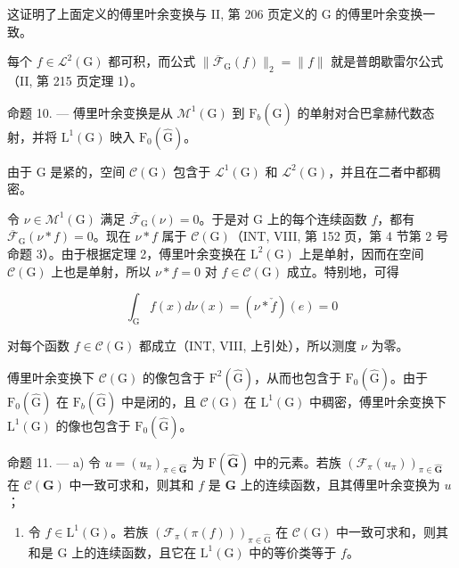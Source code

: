 这证明了上面定义的傅里叶余变换与 II, 第 206 页定义的 G 的傅里叶余变换一致。

每个 \(f \in \mathcal{L}^2(\mathrm{G})\) 都可积，而公式 \(\| \overline{\mathcal{F}}_{\mathrm{G}}(f)\| _2 = \| f\|\) 就是普朗歇雷尔公式（II, 第 215 页定理 1）。

命题 10. --- 傅里叶余变换是从 \(\mathcal{M}^{1}(\mathrm{G})\) 到 \(\mathrm{F}_{b}(\widehat{\mathrm{G}})\) 的单射对合巴拿赫代数态射，并将 \(\mathrm{L}^{1}(\mathrm{G})\) 映入 \(\mathrm{F}_{0}(\widehat{\mathrm{G}})\)。

由于 G 是紧的，空间 \(\mathcal{C}(\mathrm{G})\) 包含于 \(\mathcal{L}^{1}(\mathrm{G})\) 和 \(\mathcal{L}^{2}(\mathrm{G})\)，并且在二者中都稠密。

令 \(\nu \in \mathcal{M}^1 (\mathrm{G})\) 满足 \(\overline{\mathcal{F}}_{\mathrm{G}}(\nu) = 0\)。于是对 G 上的每个连续函数 \(f\)，都有 \(\overline{\mathcal{F}}_{\mathrm{G}}(\nu *f) = 0\)。现在 \(\nu *f\) 属于 \(\mathcal{C}(\mathrm{G})\)（INT, VIII, 第 152 页，第 4 节第 2 号命题 3）。由于根据定理 2，傅里叶余变换在 \(\mathrm{L}^2 (\mathrm{G})\) 上是单射，因而在空间 \(\mathcal{C}(\mathrm{G})\) 上也是单射，所以 \(\nu *f = 0\) 对 \(f\in \mathcal{C}(\mathrm{G})\) 成立。特别地，可得

\[
\int_ {\mathrm{G}} f (x) d \nu (x) = (\nu * \check {f}) (e) = 0
\]

对每个函数 \(f \in \mathcal{C}(\mathrm{G})\) 都成立（INT, VIII, 上引处），所以测度 \(\nu\) 为零。

傅里叶余变换下 \(\mathcal{C}(\mathrm{G})\) 的像包含于 \(\mathrm{F}^2 (\widehat{\mathrm{G}})\)，从而也包含于 \(\mathrm{F}_0(\widehat{\mathrm{G}})\)。由于 \(\mathrm{F}_0(\widehat{\mathrm{G}})\) 在 \(\mathrm{F}_b(\widehat{\mathrm{G}})\) 中是闭的，且 \(\mathcal{C}(\mathrm{G})\) 在 \(\mathrm{L}^1 (\mathrm{G})\) 中稠密，傅里叶余变换下 \(\mathrm{L}^1 (\mathrm{G})\) 的像也包含于 \(\mathrm{F}_0(\widehat{\mathrm{G}})\)。

命题 11. --- a) 令 \(u = (u_{\pi})_{\pi \in \widehat{\mathbf{G}}}\) 为 \(\mathrm{F}(\widehat{\mathbf{G}})\) 中的元素。若族 \((\mathcal{F}_{\pi}(u_{\pi}))_{\pi \in \widehat{\mathbf{G}}}\) 在 \(\mathcal{C}(\mathbf{G})\) 中一致可求和，则其和 \(f\) 是 \(\mathbf{G}\) 上的连续函数，且其傅里叶余变换为 \(u\)；

\begin{enumerate}
\def\labelenumi{\alph{enumi})}
\setcounter{enumi}{1}
\tightlist
\item
  令 \(f \in \mathrm{L}^1(\mathrm{G})\)。若族 \((\mathcal{F}_\pi(\pi(f)))_{\pi \in \widehat{\mathrm{G}}}\) 在 \(\mathcal{C}(\mathrm{G})\) 中一致可求和，则其和是 \(\mathrm{G}\) 上的连续函数，且它在 \(\mathrm{L}^1(\mathrm{G})\) 中的等价类等于 \(f\)。
\end{enumerate}

